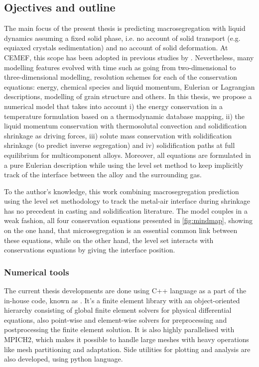 \subsection{Ojectives and outline}
The main focus of the present thesis is predicting macrosegregation with liquid dynamics assuming a fixed solid phase, i.e. no account of solid 
transport (e.g. equiaxed crystals sedimentation) and no account of solid deformation. At CEMEF, this scope has been adopted in previous 
studies by \citet{gouttebroze_modelisation_2005, liu_finite_2005, mosbah_multiple_2008, rivaux_simulation_2011, carozzani_developpement_2012}.
Nevertheless, many modelling features evolved with time such as going from two-dimensional to three-dimensional modelling, resolution schemes
for each of the conservation equations: energy, chemical species and liquid momentum, Eulerian or Lagrangian descriptions, 
modelling of grain structure and others. In this thesis, we propose a numerical model that takes into account 
i) the energy conservation in a temperature formulation based on a thermodynamic database mapping,
ii) the liquid momentum conservation with thermosolutal convection and solidification shrinkage as driving forces, 
iii) solute mass conservation with solidification shrinkage (to predict inverse segregation) and 
iv) solidification paths at full equilibrium for multicomponent alloys. 
Moreover, all equations are formulated in a pure Eulerian description while using the level set method to keep 
implicitly track of the interface between the alloy and the surrounding gas. 

To the author's knowledge, this work 
combining macrosegregation prediction using the level set methodology to track the metal-air interface during 
shrinkage has no precedent in casting and solidification literature. The model couples in a weak fashion, all four
conservation equations presented in \cref{fig:mindmap}, showing on the one hand, that microsegregation is an essential 
common link between these equations, while on the other hand, the level set interacts with conservations equations by
giving the interface position. 
%
\subsubsection{Numerical tools}
The current thesis developments are done using C++ language as a part of the
in-house code, known as \cimlib \citep{mesri_advanced_2009}. It's a finite element library with an object-oriented hierarchy
consisting of global finite element solvers for physical differential equations, also point-wise and element-wise solvers for 
preprocessing and postprocessing the finite element solution. It is also highly parallelised with MPICH2, which makes it possible
to handle large meshes with heavy operations like mesh partitioning and adaptation. Side utilities for plotting and analysis
are also developed, using python language.

